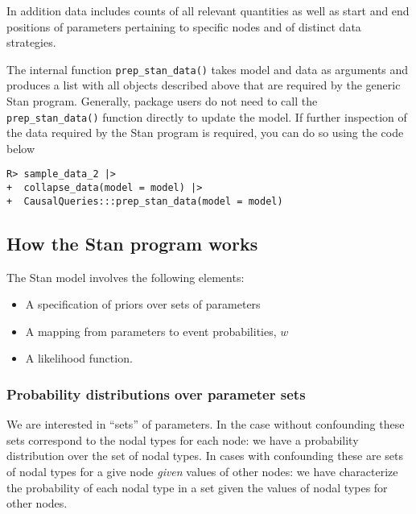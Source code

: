 \documentclass[
  11pt,
  article]{jss}
\providecommand{\tightlist}{%
  \setlength{\itemsep}{0pt}\setlength{\parskip}{0pt}}\usepackage{longtable,booktabs,array}
\begin{document}
In addition data includes counts of all relevant quantities as well as
start and end positions of parameters pertaining to specific nodes and
of distinct data strategies.

The internal function \texttt{prep\_stan\_data()} takes model and data
as arguments and produces a list with all objects described above that
are required by the generic Stan program. Generally, package users do
not need to call the \texttt{prep\_stan\_data()} function directly to
update the model. If further inspection of the data required by the Stan
program is required, you can do so using the code below

\begin{verbatim}
R> sample_data_2 |> 
+  collapse_data(model = model) |> 
+  CausalQueries:::prep_stan_data(model = model)
\end{verbatim}

\hypertarget{how-the-stan-program-works}{%
\subsection{How the Stan program
works}\label{how-the-stan-program-works}}

The Stan model involves the following elements:

\begin{itemize}
\tightlist
\item
  A specification of priors over sets of parameters
\item
  A mapping from parameters to event probabilities, \(w\)
\item
  A likelihood function.
\end{itemize}

\hypertarget{probability-distributions-over-parameter-sets}{%
\subsubsection{Probability distributions over parameter
sets}\label{probability-distributions-over-parameter-sets}}

We are interested in ``sets'' of parameters. In the case without
confounding these sets correspond to the nodal types for each node: we
have a probability distribution over the set of nodal types. In cases
with confounding these are sets of nodal types for a give node
\emph{given} values of other nodes: we have characterize the probability
of each nodal type in a set given the values of nodal types for other
nodes.
\end{document}
